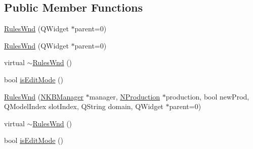 \subsection*{Public Member Functions}
\begin{DoxyCompactItemize}
\item 
\hyperlink{class_rules_wnd_a16941041c0f03e673ec260db9a280707}{RulesWnd} (QWidget $\ast$parent=0)
\item 
\hyperlink{class_rules_wnd_a16941041c0f03e673ec260db9a280707}{RulesWnd} (QWidget $\ast$parent=0)
\item 
virtual \hyperlink{class_rules_wnd_af8be272ba8ca62e74963cdabab9d5264}{$\sim$RulesWnd} ()
\item 
bool \hyperlink{class_rules_wnd_a8107fa811794feb1ff4dd425e29aa6eb}{isEditMode} ()
\item 
\hyperlink{class_rules_wnd_ab759dc08111bb85250e78f2b89dae310}{RulesWnd} (\hyperlink{class_n_k_b_manager}{NKBManager} $\ast$manager, \hyperlink{class_n_production}{NProduction} $\ast$production, bool newProd, QModelIndex slotIndex, QString domain, QWidget $\ast$parent=0)
\item 
virtual \hyperlink{class_rules_wnd_a56444223c86371095ac8741b1c703046}{$\sim$RulesWnd} ()
\item 
bool \hyperlink{class_rules_wnd_a8107fa811794feb1ff4dd425e29aa6eb}{isEditMode} ()
\end{DoxyCompactItemize}


